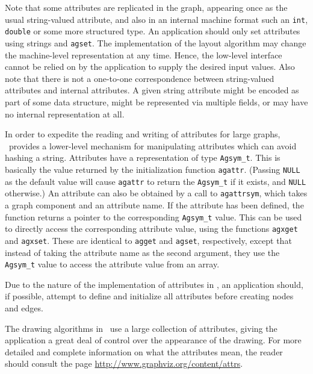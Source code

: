 Note that some attributes are replicated in the graph, appearing once
as the usual string-valued attribute, and also in an internal machine
format such an {\tt int}, {\tt double} or some more structured type.
An application should only set attributes using strings and {\tt agset}.
The implementation of the layout algorithm
may change the machine-level representation at any time.
Hence, the low-level
interface cannot be relied on by the application to supply the desired
input values. Also note that there
is not a one-to-one correspondence between string-valued
attributes and internal attributes. A given string attribute might be
encoded as part of some data structure, might be represented via 
multiple fields, or may have no internal representation at all. 

In order to expedite the reading and writing of attributes for large
graphs, \gviz\ provides a lower-level mechanism for manipulating attributes
which can avoid hashing a string.
Attributes have a representation of type \verb+Agsym_t+. This is basically the
value returned by the initialization function {\tt agattr}. (Passing {\tt NULL}
as the default value will cause {\tt agattr} to return the \verb+Agsym_t+ if
it exists, and {\tt NULL} otherwise.)
An attribute can also be obtained by a call to {\tt agattrsym}, which takes
a graph component and an attribute name. If the attribute has been defined,
the function returns a pointer to the corresponding \verb+Agsym_t+ value. 
This can be used to directly access the corresponding attribute value,
using the functions {\tt agxget} and {\tt agxset}. These are identical to 
{\tt agget} and {\tt agset}, respectively, except that instead of
taking the attribute name as the second argument, they use 
the \verb+Agsym_t+ value to access the attribute
value from an array.

Due to the nature of the implementation of attributes in \gviz, an application 
should, if possible, attempt to define and initialize all
attributes before creating nodes and edges.

The drawing algorithms in \gviz\ use a large collection of attributes,
giving the application a great deal of control over the appearance of the
drawing. For more detailed and complete information on what the attributes mean, the
reader should consult the page \url{http://www.graphviz.org/content/attrs}.

